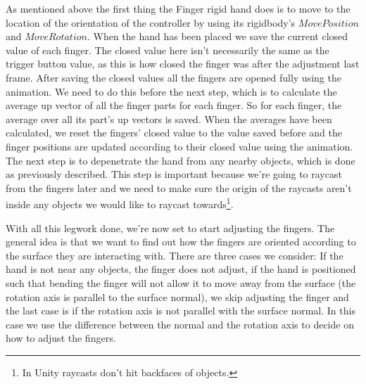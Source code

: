 As mentioned above the first thing the Finger rigid hand does is to move to the location of the orientation of the controller by using its rigidbody's $MovePosition$ and $MoveRotation$. When the hand has been placed we save the current closed value of each finger. The closed value here isn't necessarily the same as the trigger button value, as this is how closed the finger was after the adjustment last frame. After saving the closed values all the fingers are opened fully using the animation. We need to do this before the next step, which is to calculate the average up vector of all the finger parts for each finger. So for each finger, the average over all its part's up vectors is saved. When the averages have been calculated, we reset the fingers' closed value to the value saved before and the finger positions are updated according to their closed value using the animation. The next step is to depenetrate the hand from any nearby objects, which is done as previously described. This step is important because we're going to raycast from the fingers later and we need to make sure the origin of the raycasts aren't inside any objects we would like to raycast towards\footnote{In Unity raycasts don't hit backfaces of objects.}. 

With all this legwork done, we're now set to start adjusting the fingers. The general idea is that we want to find out how the fingers are oriented according to the surface they are interacting with. There are three cases we consider: If the hand is not near any objects, the finger does not adjust, if the hand is positioned such that bending the finger will not allow it to move away from the surface (the rotation axis is parallel to the surface normal), we skip adjusting the finger and the last case is if the rotation axis is not parallel with the surface normal. In this case we use the difference between the normal and the rotation axis to decide on how to adjust the fingers.

